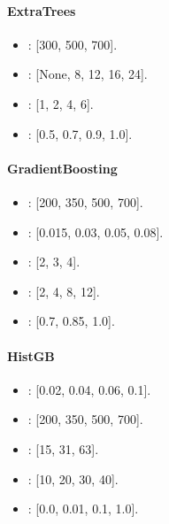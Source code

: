 \paragraph{ExtraTrees}

\begin{itemize}

\item {}: [300, 500, 700].

\item {}: [None, 8, 12, 16, 24].

\item {}: [1, 2, 4, 6].

\item {}: [0.5, 0.7, 0.9, 1.0].

\end{itemize}

\paragraph{GradientBoosting}

\begin{itemize}

\item {}: [200, 350, 500, 700].

\item {}: [0.015, 0.03, 0.05, 0.08].

\item {}: [2, 3, 4].

\item {}: [2, 4, 8, 12].

\item {}: [0.7, 0.85, 1.0].

\end{itemize}

\paragraph{HistGB}

\begin{itemize}

\item {}: [0.02, 0.04, 0.06, 0.1].

\item {}: [200, 350, 500, 700].

\item {}: [15, 31, 63].

\item {}: [10, 20, 30, 40].

\item {}: [0.0, 0.01, 0.1, 1.0].

\end{itemize}

